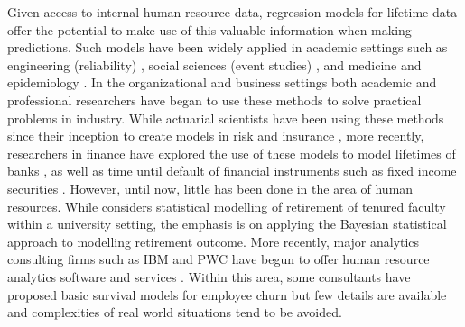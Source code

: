 \documentclass[12pt,letterpaper]{article}
\begin{document}
Given access to internal human resource data, regression models for lifetime data offer the potential to make use of this valuable information when making predictions.  Such models have been widely applied in academic settings such as engineering (reliability) \citep{lawless2011}
, social sciences (event studies) \citep{allison2010,long2006}, and medicine and epidemiology \citep{kalbfleisch2011,Kleinmoeschberger2003}.  In the organizational and business settings both academic and professional researchers have began to use these methods to solve practical problems in industry. While actuarial scientists have been using these methods since their inception to create models in risk and insurance \citep{brockett2008}, more recently, researchers in finance have explored the use of these models to model lifetimes of banks \citep{Lane1986}, as well as time until default of financial instruments such as fixed income securities \citep{leclere2005}.
However, until now, little has been done in the area of human resources.   While \citet{berger1993} considers statistical modelling of retirement of tenured faculty within a university setting, the emphasis is on applying the Bayesian statistical approach to modelling retirement outcome.  More recently, major analytics consulting firms such as IBM and PWC have begun to offer human resource analytics software and services \citep{IBM,PWC}.  Within this area, some consultants have proposed basic survival models for employee churn \citep{briggs2015} but few details are available and complexities of real world situations tend to be avoided.

\end{document}
